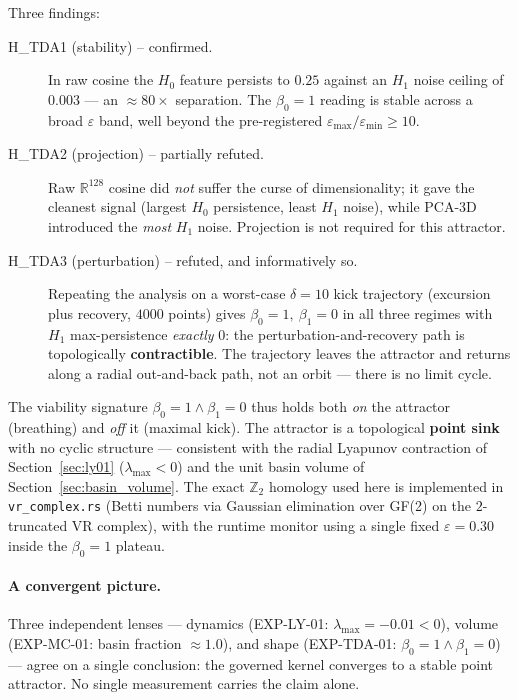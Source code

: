 \documentclass[11pt, a4paper]{article}
\newcommand{\R}{\mathbb{R}}
\begin{document}
Three findings:

\begin{description}
  \item[H\_TDA1 (stability) -- confirmed.] In raw cosine the $H_0$ feature
    persists to $0.25$ against an $H_1$ noise ceiling of $0.003$ ---
    an $\approx 80\times$ separation. The $\beta_0 = 1$ reading is stable
    across a broad $\varepsilon$ band, well beyond the pre-registered
    $\varepsilon_\text{max}/\varepsilon_\text{min} \geq 10$.
  \item[H\_TDA2 (projection) -- partially refuted.] Raw $\R^{128}$ cosine did
    \emph{not} suffer the curse of dimensionality; it gave the cleanest signal
    (largest $H_0$ persistence, least $H_1$ noise), while PCA-3D introduced the
    \emph{most} $H_1$ noise. Projection is not required for this attractor.
  \item[H\_TDA3 (perturbation) -- refuted, and informatively so.] Repeating the
    analysis on a worst-case $\delta=10$ kick trajectory (excursion plus
    recovery, $4000$ points) gives $\beta_0=1,\ \beta_1=0$ in all three regimes
    with $H_1$ max-persistence \emph{exactly} $0$: the perturbation-and-recovery
    path is topologically \textbf{contractible}. The trajectory leaves the
    attractor and returns along a radial out-and-back path, not an orbit ---
    there is no limit cycle.
\end{description}

The viability signature $\beta_0 = 1 \wedge \beta_1 = 0$ thus holds both
\emph{on} the attractor (breathing) and \emph{off} it (maximal kick). The
attractor is a topological \textbf{point sink} with no cyclic structure ---
consistent with the radial Lyapunov contraction of Section~\ref{sec:ly01}
($\lambda_\text{max} < 0$) and the unit basin volume of
Section~\ref{sec:basin_volume}. The exact $\mathbb{Z}_2$ homology used here is
implemented in \texttt{vr\_complex.rs} (Betti numbers via Gaussian elimination
over GF(2) on the $2$-truncated VR complex), with the runtime monitor using a
single fixed $\varepsilon = 0.30$ inside the $\beta_0=1$ plateau.

\paragraph{A convergent picture.} Three independent lenses --- dynamics
(EXP-LY-01: $\lambda_\text{max} = -0.01 < 0$), volume (EXP-MC-01: basin
fraction $\approx 1.0$), and shape (EXP-TDA-01: $\beta_0=1 \wedge \beta_1=0$)
--- agree on a single conclusion: the governed kernel converges to a stable
point attractor. No single measurement carries the claim alone.
\end{document}

